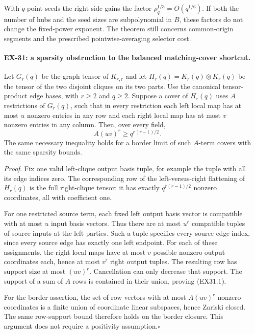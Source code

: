 With $q$-point seeds the right side gains the factor
$\rho_q^{1/3}=O(q^{1/6})$. If both the number of hubs
and the seed sizes are subpolynomial in $B$, these factors
do not change the fixed-power exponent. The theorem still
concerns common-origin segments and the prescribed
pointwise-averaging selector cost.

\paragraph{EX-31: a sparsity obstruction to the balanced matching-cover shortcut.}
Let $G_r(q)$ be the graph tensor of $K_{r,r}$ and let
$H_r(q)=K_r(q)\otimes K_r(q)$ be the tensor of the two
disjoint cliques on its two parts. Use the canonical tensor-product
edge bases, with $r\ge2$ and $q\ge2$. Suppose a cover of
$H_r(q)$ uses $A$ restrictions of $G_r(q)$, such that in every
restriction each left local map has at most $u$ nonzero entries
in any row and each right local map has at most $v$ nonzero
entries in any column. Then, over every field,
\[
 A(uv)^r\ge q^{r(r-1)/2}.
 \tag{EX31.1}
\]
The same necessary inequality holds for a border limit of such
$A$-term covers with the same sparsity bounds.

\emph{Proof.}
Fix one valid left-clique output basis tuple, for example the
tuple with all its edge indices zero. The corresponding row
of the left-versus-right flattening of $H_r(q)$ is the full
right-clique tensor: it has exactly $q^{r(r-1)/2}$ nonzero
coordinates, all with coefficient one.

For one restricted source term, each fixed left output basis
vector is compatible with at most $u$ input basis vectors.
Thus there are at most $u^r$ compatible tuples of source
inputs at the left parties. Such a tuple specifies every
source edge index, since every source edge has exactly one
left endpoint. For each of these assignments, the right
local maps have at most $v$ possible nonzero output coordinates
each, hence at most $v^r$ right output tuples. The resulting
row has support size at most $(uv)^r$. Cancellation can only
decrease that support. The support of a sum of $A$ rows is
contained in their union, proving (EX31.1).

For the border assertion, the set of row vectors with at most
$A(uv)^r$ nonzero coordinates is a finite union of coordinate
linear subspaces, hence Zariski closed. The same row-support
bound therefore holds on the border closure. This argument
does not require a positivity assumption.\hfill$\square$

